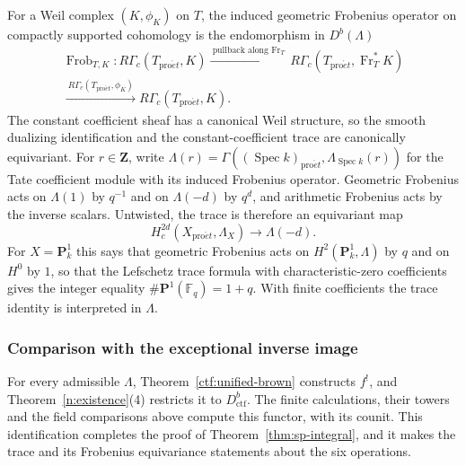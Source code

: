 \documentclass[11pt,a4paper]{article}
\numberwithin{equation}{section}
\theoremstyle{definition}
\theoremstyle{remark}
\newcommand{\proet}{\mathrm{pro}\acute{e}t}
\newcommand{\Dctf}{D^b_{\mathrm{ctf}}}
\begin{document}
For a Weil complex $(K,\phi_K)$ on $T$, the induced geometric
Frobenius operator on compactly supported cohomology is the
endomorphism in $D^b(\Lambda)$
\[
\begin{gathered}
 \operatorname{Frob}_{T,K}:R\Gamma_c(T_{\proet},K)
   \xrightarrow{\ \text{pullback along }\operatorname{Fr}_T\ }
 R\Gamma_c(T_{\proet},\operatorname{Fr}_T^*K)\\
   \xrightarrow{\ R\Gamma_c(T_{\proet},\phi_K)\ }
 R\Gamma_c(T_{\proet},K).
\end{gathered}
\]
The constant coefficient sheaf has a canonical Weil structure, so the
smooth dualizing identification and the constant-coefficient trace are
canonically equivariant. For $r\in\mathbf Z$, write
$\Lambda(r)=\Gamma((\operatorname{Spec}k)_{\proet},
\Lambda_{\operatorname{Spec}k}(r))$ for the Tate coefficient
module with its induced Frobenius operator. Geometric Frobenius acts on
$\Lambda(1)$ by $q^{-1}$ and on $\Lambda(-d)$ by $q^d$, and arithmetic
Frobenius acts by the inverse scalars. Untwisted, the trace is
therefore an equivariant map
\[
 H_c^{2d}(X_{\proet},\Lambda_X)\longrightarrow\Lambda(-d).
\]
For $X=\mathbf P^1_k$ this says that geometric Frobenius acts on
$H^2(\mathbf P^1_k,\Lambda)$ by $q$ and on $H^0$ by $1$, so that the
Lefschetz trace formula with characteristic-zero coefficients gives
the integer equality $\#\mathbf P^1(\mathbb F_q)=1+q$. With finite
coefficients the trace identity is interpreted in $\Lambda$.

\subsubsection{Comparison with the exceptional inverse image}

For every admissible $\Lambda$, Theorem~\ref{ctf:unified-brown}
constructs $f^!$, and Theorem~\ref{n:existence}(4) restricts it to
$\Dctf$. The finite calculations, their towers and the field
comparisons above compute this functor, with its counit. This
identification completes the proof of Theorem~\ref{thm:sp-integral},
and it makes the trace and its Frobenius equivariance statements about
the six operations.
\end{document}
